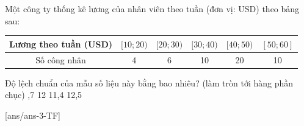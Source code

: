 \begin{ex}%
	Một công ty thống kê lương của nhân viên theo tuần (đơn vị: USD) theo bảng sau:
	\begin{center}
		\begin{tabular}{|c|c|c|c|c|c|}
			\hline
			Lương theo tuần (USD) & $[10; 20)$ & $[20; 30)$ & $[30; 40)$ & $[40; 50)$ & $[50; 60]$ \\
			\hline
			Số công nhân          & 4          & 6          & 10         & 20         & 10         \\
			\hline
		\end{tabular}
	\end{center}
	Độ lệch chuẩn của mẫu số liệu này bằng bao nhiêu? (làm tròn tới hàng phần chục)
	\choice
	{,7}
	{12}
	{11,4}
	{12,5}
\end{ex}
\TNTF
{}[ans/ans-3-TF]
